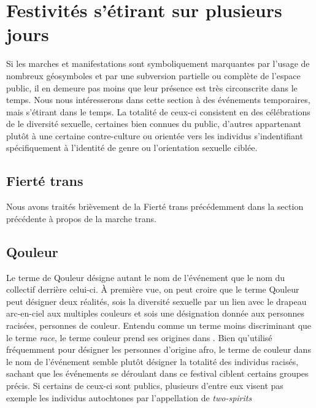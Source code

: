 \section{Festivités s'étirant sur plusieurs jours}
\label{sec:festivitesplusieursjours}
Si les marches et manifestations sont symboliquement marquantes par l'usage de nombreux géosymboles et par une subversion partielle ou complète de l'espace public, il en demeure pas moins que leur présence est très circonscrite dans le temps.
Nous nous intéresserons dans cette section à des événements temporaires, mais s'étirant dans le temps.
La totalité de ceux-ci consistent en des célébrations de le diversité sexuelle, certaines bien connues du public, d'autres appartenant plutôt à une certaine contre-culture ou orientée vers les individus s'indentifiant spécifiquement à l'identité de genre ou l'orientation sexuelle ciblée.

\subsection{Fierté trans}
\label{subsec:fiertetrans}
Nous avons traités brièvement de la Fierté trans précédemment dans la section précédente à propos de la marche trans.

\subsection{Qouleur}
\label{subsec:qouleur}
Le terme de Qouleur désigne autant le nom de l'événement que le nom du collectif derrière celui-ci.
À première vue, on peut croire que le terme Qouleur peut désigner deux réalités, sois la diversité sexuelle par un lien avec le drapeau arc-en-ciel aux multiples couleurs et sois une désignation donnée aux personnes racisées, personnes de couleur.
Entendu comme un terme moins discriminant que le terme \emph{race}, le terme couleur prend ses origines dans .
Bien qu'utilisé fréquemment pour désigner les personnes d'origine afro, le terme de couleur dans le nom de l'événement semble plutôt désigner la totalité des individus racisés, sachant que les événements se déroulant dans ce festival ciblent certains groupes précis.
Si certains de ceux-ci sont publics, plusieurs d'entre eux visent pas exemple les individus autochtones par l'appellation de \emph{two-spirits}

